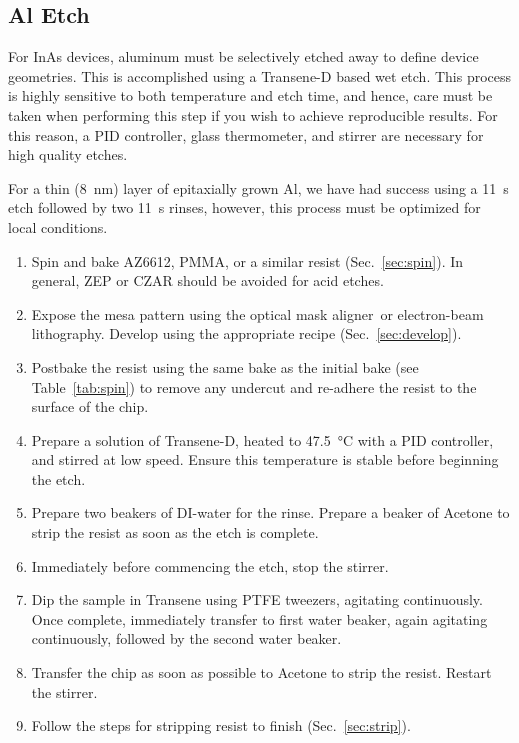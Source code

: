 \subsection{Al Etch}
\label{sec:transene}
For InAs devices, aluminum must be selectively etched away to define device geometries. This is accomplished
using a Transene-D based wet etch. This process is highly sensitive to both temperature
and etch time, and hence, care must be taken when performing this step if you wish to achieve reproducible
results. For this reason, a PID controller, glass thermometer, and stirrer are necessary for high quality etches.

For a thin (\SI{8}{\nano\meter}) layer of epitaxially grown Al, we have had success using a \SI{11}{\second} etch
followed by two \SI{11}{\second}  rinses, however, this process must be optimized for local conditions.



\begin{enumerate}
    \item Spin and bake AZ6612, PMMA, or a similar resist (Sec.~\ref{sec:spin}). In general, ZEP or CZAR should be avoided for acid etches.
    \item Expose the mesa pattern using the optical mask aligner\ or electron-beam lithography. Develop using the appropriate recipe (Sec.~\ref{sec:develop}).
    \item Postbake the resist using the same bake as the initial bake (see Table~\ref{tab:spin}) to remove any undercut and re-adhere the resist to the surface of the chip.
    \item Prepare a solution of Transene-D, heated to \SI{47.5}{\celsius} with a PID controller, and stirred at low speed. Ensure this temperature is stable before beginning the etch.
    \item Prepare two beakers of DI-water for the rinse. Prepare a beaker of Acetone to strip the resist as soon as the etch is complete.
    \item Immediately before commencing the etch, stop the stirrer.
    \item Dip the sample in Transene using PTFE tweezers, agitating continuously. Once complete, immediately transfer to first water beaker, again agitating continuously, followed by the second water beaker.
    \item Transfer the chip as soon as possible to Acetone to strip the resist. Restart the stirrer.
    \item Follow the steps for stripping resist to finish (Sec.~\ref{sec:strip}).
\end{enumerate}

